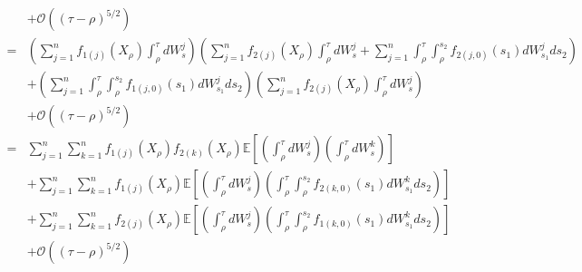 \documentclass[12pt]{article}
\begin{document}
\begin{equation}
\begin{aligned}
\\ & + \mathcal{O} ((\tau - \rho)^{5/2}) \\
= 
 & \left( \sum_{j=1}^n f_{1(j)}(X_\rho) \int_\rho^\tau dW_s^j \right)
  \left( \sum_{j=1}^n f_{2(j)} (X_\rho) \int_\rho^\tau dW_s^j 
 + \sum_{j=1}^n \int_\rho^\tau \int_\rho^{s_2} f_{2(j,0)} (s_1) dW_{s_1}^j ds_2 \right) \\
 & + \left( \sum_{j=1}^n \int_\rho^\tau \int_\rho^{s_2} f_{1(j,0)}(s_1) dW_{s_1}^j ds_2 \right)
\left(  \sum_{j=1}^n f_{2(j)} (X_\rho) \int_\rho^\tau dW_s^j  \right) \\
 & + \mathcal{O} ((\tau - \rho)^{5/2}) \\
 =  &  \sum_{j=1}^n \sum_{k=1}^n f_{1(j)}(X_\rho) f_{2(k)}(X_\rho) \mathbb{E} \left[ \left(\int_\rho^\tau dW_s^j \right)  \left(\int_\rho^\tau dW_s^k \right) \right] \\
 & + \sum_{j=1}^n \sum_{k=1}^n f_{1(j)}(X_\rho) \mathbb{E} \left[ \left(\int_\rho^\tau dW_s^j \right)  \left(\int_\rho^\tau \int_{\rho}^{s_2} f_{2(k,0)}(s_1) dW_{s_1}^k ds_2 \right) \right] \\ 
 & + \sum_{j=1}^n \sum_{k=1}^n f_{2(j)}(X_\rho) \mathbb{E} \left[ \left(\int_\rho^\tau dW_s^j \right)  \left(\int_\rho^\tau \int_{\rho}^{s_2} f_{1(k,0)}(s_1) dW_{s_1}^k ds_2 \right) \right] \\
& + \mathcal{O} ((\tau - \rho)^{5/2})
 \end{aligned}
\end{equation}
\end{document}

